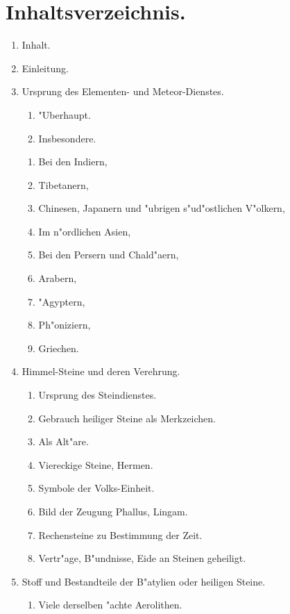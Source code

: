 \documentclass[a4paper, 11pt, oneside, polutonikogreek, german]{article}
\begin{document}
\section*{Inhaltsverzeichnis.}
\begin{enumerate}
    \item[] Inhalt.
    \item[] Einleitung.
    \item Ursprung des Elementen- und Meteor-Dienstes.
    \begin{enumerate}
        \item "Uberhaupt.
        \item Insbesondere.
    \end{enumerate}
    \begin{enumerate}
        \item Bei den Indiern,
        \item Tibetanern,
        \item Chinesen, Japanern und "ubrigen s"ud"ostlichen V"olkern,
        \item Im n"ordlichen Asien,
        \item Bei den Persern und Chald"aern,
        \item Arabern,
        \item "Agyptern,
        \item Ph"oniziern,
        \item Griechen.
    \end{enumerate}
    \item Himmel-Steine und deren Verehrung.
    \begin{enumerate}
        \item Ursprung des Steindienstes.
        \item Gebrauch heiliger Steine als Merkzeichen.
        \item Als Alt"are.
        \item Viereckige Steine, Hermen.
        \item Symbole der Volks-Einheit.
        \item Bild der Zeugung Phallus, Lingam.
        \item Rechensteine zu Bestimmung der Zeit.
        \item Vertr"age, B"undnisse, Eide an Steinen geheiligt.
    \end{enumerate}
    \item Stoff und Bestandteile der B"atylien oder heiligen Steine.
    \begin{enumerate}
        \item Viele derselben "achte Aerolithen.

\end{enumerate}
\end{enumerate}
\end{document}
